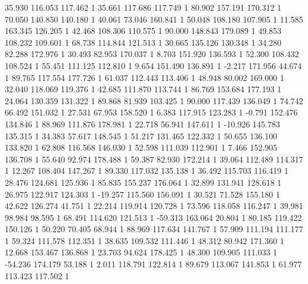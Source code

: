 	35.930 116.053 117.462 1
	35.661 117.686 117.749 1
	80.902 157.191 170.312 1
	70.050 140.850 140.180 1
	40.061 73.046 160.841 1
	50.048 108.180 107.905 1
	11.585 163.345 126.205 1
	42.468 108.306 110.575 1
	90.000 148.843 179.089 1
	49.853 108.232 109.601 1
	68.738 114.844 121.513 1
	30.665 135.126 130.348 1
	34.280 82.288 172.976 1
	30.493 82.953 170.037 1
	8.703 151.920 136.593 1
	52.300 108.432 108.524 1
	55.451 111.125 112.810 1
	9.654 151.490 136.891 1
	-2.217 171.956 44.674 1
	89.765 117.554 177.726 1
	61.037 112.443 113.406 1
	48.948 80.002 169.000 1
	32.040 118.069 119.376 1
	42.685 111.870 113.744 1
	86.769 153.684 177.193 1
	24.064 130.359 131.322 1
	89.868 81.939 103.425 1
	90.000 117.439 136.049 1
	74.742 66.492 151.032 1
	27.531 67.953 158.520 1
	6.383 117.915 123.283 1
	-0.791 152.476 134.846 1
	88.969 111.876 178.981 1
	22.718 56.941 147.611 1
	-10.926 145.783 135.315 1
	34.383 57.617 148.545 1
	51.217 131.465 122.332 1
	50.655 136.100 133.820 1
	62.808 116.568 146.030 1
	52.598 111.039 112.901 1
	7.466 152.905 136.708 1
	55.640 92.974 178.488 1
	59.387 82.930 172.214 1
	39.064 112.489 114.317 1
	12.267 108.404 147.267 1
	89.330 117.032 135.138 1
	36.492 115.703 116.419 1
	28.476 124.681 125.936 1
	85.835 155.237 176.064 1
	32.899 131.941 128.618 1
	26.975 122.917 124.303 1
	-19.257 115.560 156.091 1
	30.521 71.528 155.180 1
	42.622 126.274 41.751 1
	22.214 119.914 120.728 1
	73.596 118.058 116.247 1
	39.981 98.984 98.595 1
	68.491 114.620 121.513 1
	-59.313 163.064 20.804 1
	80.185 119.422 150.126 1
	50.220 70.405 68.944 1
	88.969 117.634 141.767 1
	57.909 111.194 111.177 1
	59.324 111.578 112.351 1
	38.635 109.532 111.446 1
	48.312 80.942 171.360 1
	12.668 153.467 136.868 1
	23.703 94.624 178.425 1
	48.300 109.905 111.033 1
	-54.236 174.179 53.188 1
	2.011 118.791 122.814 1
	89.679 113.067 141.853 1
	61.977 113.423 117.502 1
